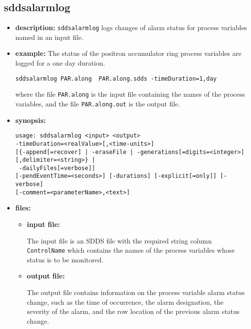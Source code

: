 %
%
\begin{latexonly}
\newpage
\end{latexonly}

%
%
\subsection{sddsalarmlog}
\label{sddsalarmlog}

\begin{itemize}
\item {\bf description:}
%
%
\verb+sddsalarmlog+ logs changes of alarm status for process variables named in an input file.
\item {\bf example:} 
%
% 
%
The status of the positron accumulator ring process variables are logged
for a one day duration.
\begin{verbatim}
sddsalarmlog PAR.along  PAR.along.sdds -timeDuration=1,day 
\end{verbatim}
where the file \verb+PAR.along+ is the input file containing the names of the
process variables, and the file \verb+PAR.along.out+ is the output file.

\item {\bf synopsis:} 
%
%
\begin{verbatim}
usage: sddsalarmlog <input> <output> 
-timeDuration=<realValue>[,<time-units>]
[{-append[=recover] | -eraseFile | -generations[=digits=<integer>][,delimiter=<string>} |
 -dailyFiles[=verbose]]
[-pendEventTime=<seconds>] [-durations] [-explicit[=only]] [-verbose]
[-comment=<parameterName>,<text>] 
\end{verbatim}

\item {\bf files:}
\begin{itemize}
\item {\bf input file:}\par
The input file is an SDDS file with the required string column {\tt ControlName}
which contains the names of the process variables whose status is to be monitored.

\item {\bf output file:}\par
The output file contains information on the process variable alarm status
change, such as the time of occurrence, the alarm designation, the severity of the alarm, and the
row location of the previous alarm status change.


\end{itemize}
\end{itemize}

